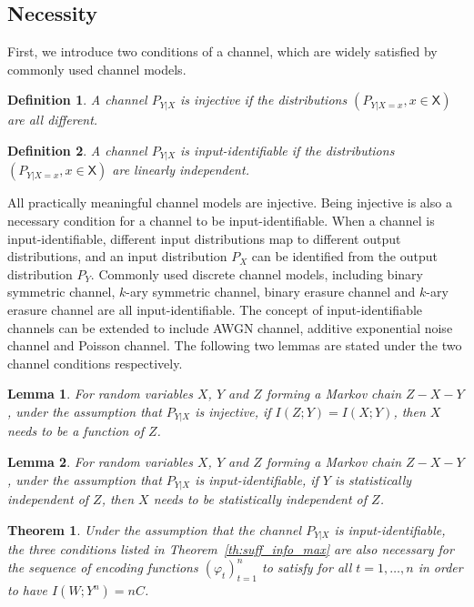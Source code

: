 \documentclass{article}
\newtheorem{theorem}{Theorem}%
\newtheorem{lemma}{Lemma}
\newtheorem{definition}{Definition}
\def\sX{{\mathsf X}}
\begin{document}
\subsection{Necessity}
First, we introduce two conditions of a channel, which are widely satisfied by commonly used channel models.
\begin{definition}
A channel $P_{Y|X}$ is injective if the distributions $(P_{Y|X=x}, x\in\sX)$ are all different.
\end{definition}
\begin{definition}
A channel $P_{Y|X}$ is input-identifiable if the distributions $(P_{Y|X=x}, x\in\sX)$ are linearly independent.
\end{definition}
All practically meaningful channel models are injective. Being injective is also a necessary condition for a channel to be input-identifiable.
When a channel is input-identifiable, different input distributions map to different output distributions, and an input distribution $P_X$ can be identified from the output distribution $P_Y$.
Commonly used discrete channel models, including binary symmetric channel, $k$-ary symmetric channel, binary erasure channel and $k$-ary erasure channel are all input-identifiable. The concept of input-identifiable channels can be extended to include AWGN channel, additive exponential noise channel and Poisson channel.
The following two lemmas are stated under the two channel conditions respectively.
\begin{lemma}\label{lm:ch_non_degrade}
For random variables $X$, $Y$ and $Z$ forming a Markov chain $Z-X-Y$, under the assumption that $P_{Y|X}$ is injective, if $I(Z;Y) = I(X;Y)$, then $X$ needs to be a function of $Z$.
\end{lemma}

\begin{lemma}\label{lm:ch_identif}
For random variables $X$, $Y$ and $Z$ forming a Markov chain $Z-X-Y$, under the assumption that $P_{Y|X}$ is input-identifiable, if $Y$ is statistically independent of $Z$, then $X$ needs to be statistically independent of $Z$.
\end{lemma}

\begin{theorem}\label{th:nece_info_max}
Under the assumption that the channel $P_{Y|X}$ is input-identifiable, the three conditions listed in Theorem~\ref{th:suff_info_max} are also necessary for the sequence of encoding functions $(\varphi_t)_{t=1}^n$ to satisfy for all $t=1,\ldots,n$ in order to have $I(W;Y^n) = nC$.
\end{theorem}
\end{document}
